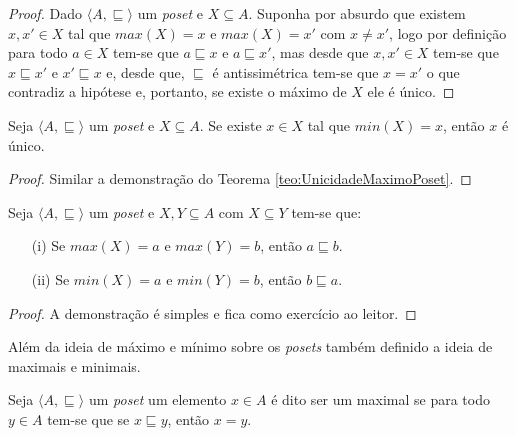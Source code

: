 \begin{proof}
	Dado $\langle A, \sqsubseteq \rangle$ um \textit{poset} e $X \subseteq A$. Suponha por absurdo que existem $x, x' \in X$ tal que $max(X) = x$ e $max(X) = x'$ com $x \neq x'$, logo por definição para todo $a \in X$ tem-se que $a \sqsubseteq x$ e $a \sqsubseteq x'$, mas desde que $x, x '\in X$ tem-se que $x \sqsubseteq x'$ e $x' \sqsubseteq x$ e, desde que, $\sqsubseteq$ é antissimétrica tem-se que $x = x'$ o que contradiz a hipótese e, portanto, se existe o máximo de $X$ ele é único.
\end{proof}

\begin{theorem}\label{teo:UnicidadeMinimoPoset}
	Seja $\langle A, \sqsubseteq \rangle$ um \textit{poset} e $X \subseteq A$. Se existe $x \in X$ tal que $min(X) = x$, então $x$ é único.
\end{theorem}

\begin{proof}
	Similar a demonstração do Teorema \ref{teo:UnicidadeMaximoPoset}.
\end{proof}

\begin{theorem}\label{teo:MonotonicidadeInclusaoMaxMin}
	Seja $\langle A, \sqsubseteq \rangle$ um \textit{poset} e $X, Y \subseteq A$ com $X \subseteq Y$ tem-se que:
	\begin{itemize}
		\item[(i)] Se $max(X) = a$ e $max(Y) = b$, então $a \sqsubseteq b$.
		\item[(ii)] Se $min(X) = a$ e $min(Y) = b$, então $b \sqsubseteq a$.
	\end{itemize}
\end{theorem}

\begin{proof}
	A demonstração é simples e fica como exercício ao leitor.
\end{proof}

Além da ideia de máximo e mínimo sobre os \textit{posets} também definido a ideia de maximais e minimais.

\begin{definition}\label{def:MaximaisPoset}
	Seja $\langle A, \sqsubseteq \rangle$ um \textit{poset}  um elemento $x \in A$ é dito ser um maximal se para todo $y \in A$ tem-se que se $x \sqsubseteq y$, então $x = y$.
\end{definition}

